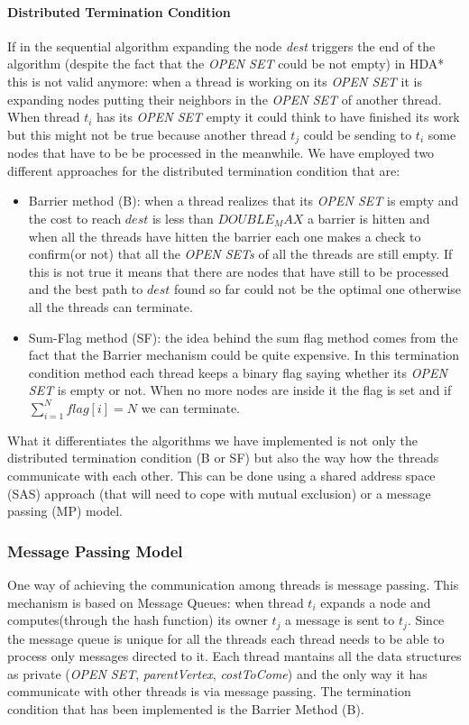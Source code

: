 \documentclass[twocolumn, switch]{article} %
\begin{document}
\paragraph{Distributed Termination Condition}
If in the sequential algorithm expanding the node \textit{dest} triggers the end of the algorithm (despite
the fact that the \textit{OPEN SET} could be not empty) in HDA* this is not valid anymore: when a thread
is working on its \textit{OPEN SET} it is expanding nodes putting their neighbors in the
\textit{OPEN SET} of another thread. When thread $t_i$ has its \textit{OPEN SET} empty it could think
to have finished its work but this might not be true because another thread $t_j$ could be sending
to $t_i$ some nodes that have to be be processed in the meanwhile. We have employed two
different approaches for the distributed termination condition that are:
\begin{itemize}
  \item Barrier method (B): when a thread realizes that its \textit{OPEN SET} is
        empty and the cost to reach $dest$ is less than $DOUBLE_MAX$ a barrier is 
        hitten and when all the threads have hitten the barrier
        each one makes a check to confirm(or not) that all the \textit{OPEN SETs} of all
        the threads are still empty. If this is not true it means that there are nodes
        that have still to be processed and the best path to $dest$ found so far could
        not be the optimal one otherwise all the threads can terminate.
  \item Sum-Flag method (SF): the idea behind the sum flag method comes from the fact that
        the Barrier mechanism could be quite expensive. In this termination condition method
        each thread keeps a binary flag saying whether its \textit{OPEN SET} is empty
        or not. When no more nodes are inside it the flag is set and if $\sum_{i=1}^{N}flag[i] = N$
        we can terminate.
\end{itemize}
What it differentiates the algorithms we have implemented is not only
the distributed termination condition (B or SF) but also the way how the threads
communicate with each other. This can be done using a shared address space (SAS) approach (that will
need to cope with mutual exclusion) or a message passing (MP) model.
\subsubsection{Message Passing Model}
One way of achieving the communication among threads is message passing. This mechanism is based
on Message Queues: when thread $t_i$ expands a node and computes(through the hash function) 
its owner $t_j$ a message is sent to $t_j$. Since the message
queue is unique for all the threads each thread needs to be able to process
only messages directed to it. Each thread mantains all the data structures as private (\textit{OPEN SET},
\textit{parentVertex}, \textit{costToCome}) and the only way it has communicate with other threads
is via message passing. The termination condition that has been implemented is the Barrier Method (B).
\end{document}
